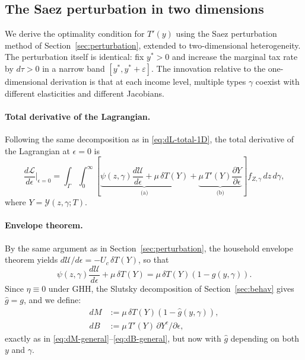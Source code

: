 \documentclass[12pt,a4paper]{article}
\theoremstyle{definition}
\theoremstyle{plain}
\theoremstyle{remark}
\newcommand{\calU}{\mathcal{U}}
\newcommand{\calL}{\mathcal{L}}
\newcommand{\calY}{\mathcal{Y}}
\begin{document}
\subsection{The Saez perturbation in two dimensions}
\label{sec:2D_perturbation}

We derive the optimality condition for $T'(y)$ using the Saez perturbation method of Section~\ref{sec:perturbation}, extended to two-dimensional heterogeneity.  The perturbation itself is identical: fix $y^* > 0$ and increase the marginal tax rate by $d\tau > 0$ in a narrow band $[y^*,y^*+\varepsilon]$.  The innovation relative to the one-dimensional derivation is that at each income level, multiple types $\gamma$ coexist with different elasticities and different Jacobians.

\paragraph{Total derivative of the Lagrangian.}
Following the same decomposition as in \eqref{eq:dL-total-1D}, the total derivative of the Lagrangian at $\epsilon = 0$ is
\begin{equation}
\label{eq:dL_2D}
  \frac{d\calL}{d\epsilon}\bigg|_{\epsilon=0}
  = \int_{\Gamma}\int_0^{\infty}\left[
    \underbrace{\psi(z,\gamma)\frac{d\calU}{d\epsilon} + \mu\,\delta T(Y)}_{\text{(a)}}
    + \underbrace{\mu\,T'(Y)\frac{\partial Y}{\partial\epsilon}}_{\text{(b)}}
  \right] f_{Z,\gamma}\,dz\,d\gamma,
\end{equation}
where $Y = \calY(z,\gamma;T)$.

\paragraph{Envelope theorem.}
By the same argument as in Section~\ref{sec:perturbation}, the household envelope theorem yields $d\calU/d\epsilon = -U_c\,\delta T(Y)$, so that
\[
  \psi(z,\gamma)\frac{d\calU}{d\epsilon} + \mu\,\delta T(Y) = \mu\,\delta T(Y)(1 - g(y,\gamma)).
\]
Since $\eta \equiv 0$ under GHH, the Slutsky decomposition of Section~\ref{sec:behav} gives $\hat{g} = g$, and we define:
\begin{align}
  dM &:= \mu\,\delta T(Y)(1 - \hat{g}(y,\gamma)), \label{eq:dM_2D}\\
  dB &:= \mu\,T'(Y)\,\partial Y^c/\partial\epsilon, \label{eq:dB_2D}
\end{align}
exactly as in \eqref{eq:dM-general}--\eqref{eq:dB-general}, but now with $\hat{g}$ depending on both $y$ and $\gamma$.
\end{document}
